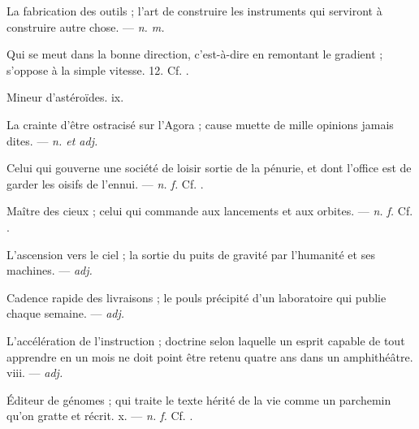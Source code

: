  La fabrication des outils ; l'art de construire les instruments qui serviront à construire autre chose. ---  \textit{n. m.}

 Qui se meut dans la bonne direction, c'est-à-dire en remontant le gradient ; s'oppose à la simple vitesse.   12. Cf. .

 Mineur d'astéroïdes.   ix.

 La crainte d'être ostracisé sur l'Agora ; cause muette de mille opinions jamais dites. ---  \textit{n. et adj.}

 Celui qui gouverne une société de loisir sortie de la pénurie, et dont l'office est de garder les oisifs de l'ennui. ---  \textit{n. f.} Cf. .

 Maître des cieux ; celui qui commande aux lancements et aux orbites. ---  \textit{n. f.} Cf. .

 L'ascension vers le ciel ; la sortie du puits de gravité par l'humanité et ses machines. ---  \textit{adj.}

 Cadence rapide des livraisons ; le pouls précipité d'un laboratoire qui publie chaque semaine. ---  \textit{adj.}

 L'accélération de l'instruction ; doctrine selon laquelle un esprit capable de tout apprendre en un mois ne doit point être retenu quatre ans dans un amphithéâtre.   viii. ---  \textit{adj.}

 Éditeur de génomes ; qui traite le texte hérité de la vie comme un parchemin qu'on gratte et récrit.   x. ---  \textit{n. f.} Cf. .

